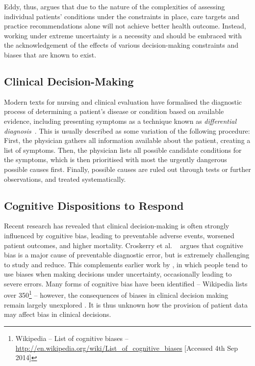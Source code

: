 \documentclass{sigchi}
\begin{document}
Eddy, thus, argues that due to the nature of the complexities of assessing individual patients' conditions under the constraints in place, care targets and practice recommendations alone will not achieve better health outcome.  Instead, working under extreme uncertainty is a necessity and should be embraced with the acknowledgement of the effects of various decision-making constraints and biases that are known to exist.

\subsection{Clinical Decision-Making} 

 Modern texts for nursing and clinical evaluation have formalised the diagnostic process of determining a patient's disease or condition based on available evidence, including presenting symptoms as a technique known as \emph{differential diagnosis}~\cite{thompson2002clinical}.  This is usually described as some variation of the following procedure: First, the physician gathers all information available about the patient, creating a list of symptoms.  Then, the physician lists all possible candidate conditions for the symptoms, which is then prioritised with most the urgently dangerous possible causes first.  Finally, possible causes are ruled out through tests or further observations, and treated systematically.  

\subsection{Cognitive Dispositions to Respond}

Recent research has revealed that clinical decision-making is often strongly influenced by cognitive bias, leading to preventable adverse events, worsened patient outcomes, and higher mortality.  Croskerry et al.  ~\cite{Croskerry2013} \cite{Graber2002} argues that cognitive bias is a major cause of preventable diagnostic error, but is extremely challenging to study and reduce. This complements earlier work by \cite{Kahneman1982}, in which people tend to use biases when making decisions under uncertainty, occasionally leading to severe errors. Many forms of cognitive bias have been identified -- Wikipedia lists over 350\footnote{Wikipedia -- List of cognitive biases -- \url{http://en.wikipedia.org/wiki/List_of_cognitive_biases} [Accessed 4th Sep 2014]} -- however, the consequences of biases in clinical decision making remain largely unexplored \cite{Croskerry2013}. It is thus unknown how the provision of patient data may affect bias in clinical decisions.
\end{document}
